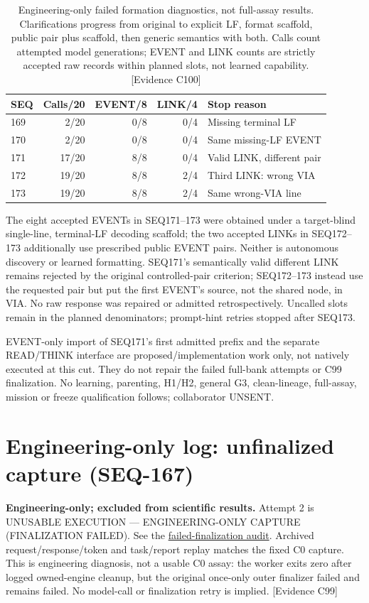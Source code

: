 \documentclass[11pt]{article}
\newcommand{\ev}[1]{\textsf{[Evidence #1]}}
\begin{document}
\begin{table}[ht]
\centering\small
\begin{tabular}{lrrrl}
\toprule
SEQ & Calls/20 & EVENT/8 & LINK/4 & Stop reason \\
\midrule
169 & 2/20 & 0/8 & 0/4 & Missing terminal LF \\
170 & 2/20 & 0/8 & 0/4 & Same missing-LF EVENT \\
171 & 17/20 & 8/8 & 0/4 & Valid LINK, different pair \\
172 & 19/20 & 8/8 & 2/4 & Third LINK: wrong VIA \\
173 & 19/20 & 8/8 & 2/4 & Same wrong-VIA line \\
\bottomrule
\end{tabular}
\caption{Engineering-only failed formation diagnostics, not full-assay results.
Clarifications progress from original to explicit LF, format scaffold,
public pair plus scaffold, then generic semantics with both. Calls count
attempted model generations; EVENT and LINK counts are strictly accepted raw
records within planned slots, not learned capability. \ev{C100}}
\end{table}

The eight accepted EVENTs in SEQ171--173 were obtained under a target-blind
single-line, terminal-LF decoding scaffold; the two accepted LINKs in SEQ172--173 additionally
use prescribed public EVENT pairs. Neither is autonomous discovery or learned
formatting. SEQ171's semantically valid different LINK remains rejected by the
original controlled-pair criterion; SEQ172--173 instead use the requested pair
but put the first EVENT's source, not the shared node, in VIA. No raw response
was repaired or admitted retrospectively. Uncalled slots remain in the planned
denominators; prompt-hint retries stopped after SEQ173.

EVENT-only import of SEQ171's first admitted prefix and the separate READ/THINK
interface are proposed/implementation work only, not natively executed at this
cut. They do not repair the failed full-bank attempts or C99 finalization.
No learning, parenting, H1/H2, general G3, clean-lineage, full-assay, mission or
freeze qualification follows; collaborator UNSENT.

\section{Engineering-only log: unfinalized capture (SEQ-167)}
\textbf{Engineering-only; excluded from scientific results.} Attempt 2 is
UNUSABLE EXECUTION --- ENGINEERING-ONLY CAPTURE (FINALIZATION FAILED).
See the \href{../research_notes/analysis/2026-09-13_pcfl_c0_attempt2_failed_finalization_audit.md}{failed-finalization audit}.
Archived request/response/token and task/report replay matches the fixed C0
capture. This is engineering diagnosis, not a usable C0 assay:
the worker exits zero after logged owned-engine cleanup, but the original
once-only outer finalizer failed and remains failed. No model-call or
finalization retry is implied. \ev{C99}
\end{document}
